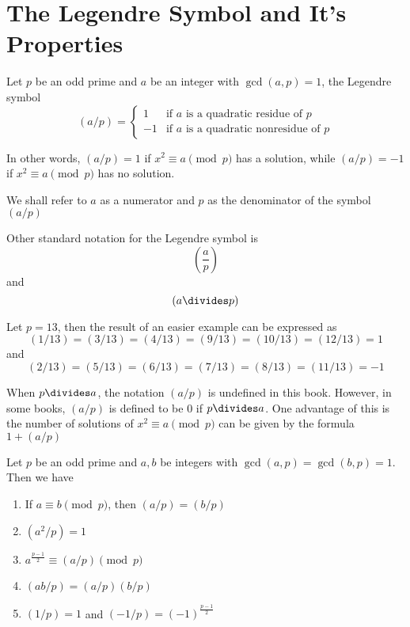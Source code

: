\section{The Legendre Symbol and It's Properties}

\begin{definition}
    Let $p$ be an odd prime and $a$ be an integer with $\gcd(a, p) = 1$, 
    the Legendre symbol
    \[
        (a/p) = \begin{cases}
            1  &\text{if } a \text{ is a quadratic residue of }p\\
            -1 &\text{if } a \text{ is a quadratic nonresidue of }p
        \end{cases}
    \]

    In other words, $(a/p) = 1$ if $x^2 \equiv a \pmod p$ has a solution,
    while $(a/p) = -1$ if $x^2 \equiv a \pmod p$ has no solution.

    We shall refer to $a$ as a numerator and $p$ as the denominator of the symbol $(a/p)$
\end{definition}

\begin{remark}
    Other standard notation for the Legendre symbol is
    \[
        (\frac{a}{p})
    \]
    and 
    \[
        (a \divides p)
    \]
\end{remark}

\begin{eg}
    Let $p = 13$, then the result of an easier example can be expressed as
    \[
        (1/13) = (3/13) = (4/13) = (9/13) = (10/13) = (12/13) = 1
    \]
    and
    \[
        (2/13) = (5/13) = (6/13) = (7/13) = (8/13) = (11/13) = -1
    \]
\end{eg}

\begin{remark}
    When $p \divides a$, the notation $(a/p)$ is undefined in this book. 
    However, in some books, $(a/p)$ is defined to be $0$ if $p \divides a$.
    One advantage of this is the number of solutions of $x^2 \equiv a \pmod p$
    can be given by the formula $1 + (a/p)$
\end{remark}

\begin{theorem}
    Let $p$ be an odd prime and $a, b$ be integers with $\gcd(a, p) = \gcd(b, p) = 1$.
    Then we have 
    \begin{enumerate}
        \item If $a \equiv b \pmod p$, then $(a/p) = (b/p)$
        \item $(a^2/p) = 1$
        \item $a^{\frac{p-1}{2}} \equiv (a/p) \pmod p$
        \item $(ab/p) = (a/p)(b/p)$
        \item $(1/p) = 1$ and $(-1/p) = {(-1)}^{\frac{p-1}{2}}$
    \end{enumerate}
\end{theorem}

